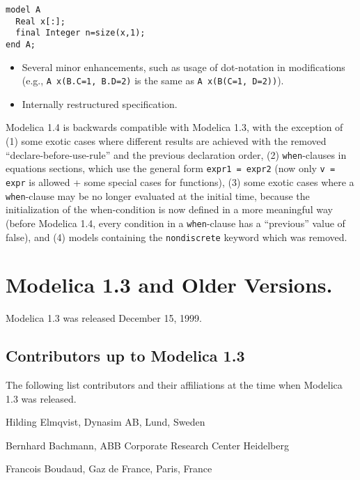 \begin{lstlisting}[language=modelica]
model A
  Real x[:];
  final Integer n=size(x,1);
end A;
\end{lstlisting}

\begin{itemize}
\item
  Several minor enhancements, such as usage of dot-notation in
  modifications\\
  (e.g., \lstinline!A x(B.C=1, B.D=2)! is the same as \lstinline!A x(B(C=1, D=2))!).
\item
  Internally restructured specification.
\end{itemize}

Modelica 1.4 is backwards compatible with Modelica 1.3, with the exception of (1) some exotic cases where different results are achieved with the removed ``declare-before-use-rule'' and the previous declaration order, (2) \lstinline!when!-clauses in equations sections, which use the general form \lstinline!expr1 = expr2! (now only \lstinline!v = expr! is allowed + some special cases for functions), (3) some exotic cases where a \lstinline!when!-clause may be no longer evaluated at the initial time, because the initialization of the when-condition is now defined in a more meaningful way (before Modelica 1.4, every condition in a \lstinline!when!-clause has a ``previous'' value of false), and (4) models containing the \lstinline[morekeywords={[2]{nondiscrete}}]!nondiscrete! keyword which was removed.

\section{Modelica 1.3 and Older Versions.}\label{modelica-1-3-and-older-versions}

Modelica 1.3 was released December 15, 1999.

\subsection{Contributors up to Modelica 1.3}\label{contributors-up-to-modelica-1-3}

The following list contributors and their affiliations at the time when Modelica 1.3 was released.

Hilding Elmqvist, Dynasim AB, Lund, Sweden

Bernhard Bachmann, ABB Corporate Research Center Heidelberg

Francois Boudaud, Gaz de France, Paris, France

